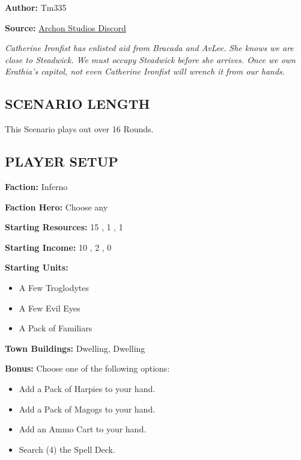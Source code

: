 
\begin{multicols*}{2}

\textbf{Author:} Tm335

\textbf{Source:} \href{https://discord.com/channels/740870068178649108/1246353361456861276/1246353361456861276}{Archon Studios Discord}

\textit{Catherine Ironfist has enlisted aid from Bracada and AvLee.
She knows we are close to Steadwick.
We must occupy Steadwick before she arrives.
Once we own Erathia's capitol, not even Catherine Ironfist will wrench it from our hands.}

\subsection*{\MakeUppercase{Scenario Length}}

This Scenario plays out over 16 Rounds.

\subsection*{\MakeUppercase{Player Setup}}

\textbf{Faction:} Inferno

\textbf{Faction Hero:} Choose any

\textbf{Starting Resources:} 15 , 1 , 1 

\textbf{Starting Income:} 10 , 2 , 0 

\textbf{Starting Units:}

\begin{itemize}
  \item A Few Troglodytes
  \item A Few Evil Eyes
  \item A Pack of Familiars
\end{itemize}

\textbf{Town Buildings:}  Dwelling,  Dwelling

\textbf{Bonus:} Choose one of the following options:
\begin{itemize}
  \item Add a Pack of Harpies to your hand.
  \item Add a Pack of Magogs to your hand.
  \item Add an Ammo Cart to your hand.
  \item Search (4) the Spell Deck.
\end{itemize}


\end{multicols*}
